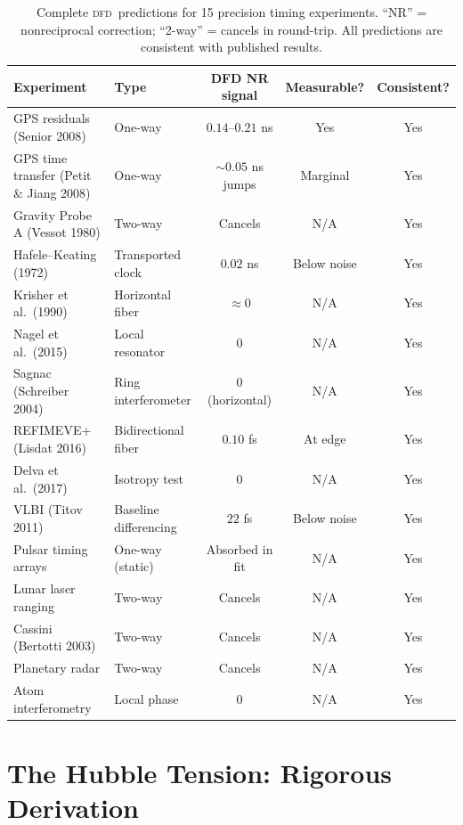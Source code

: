 \documentclass[aps,prl,twocolumn,superscriptaddress,showpacs]{revtex4-2}
\newcommand{\DFD}{\textsc{dfd}}
\begin{document}
\begin{table}[t]
\caption{Complete \DFD\ predictions for 15 precision timing experiments.
``NR'' = nonreciprocal correction; ``2-way'' = cancels in round-trip.
All predictions are consistent with published results.}
\label{tab:literature}
\begin{ruledtabular}
\begin{tabular}{llccc}
Experiment & Type & DFD NR signal & Measurable? & Consistent? \\
\hline
GPS residuals (Senior 2008) & One-way & $0.14$--$0.21$ ns & Yes & Yes \\
GPS time transfer (Petit \& Jiang 2008) & One-way & $\sim 0.05$ ns jumps & Marginal & Yes \\
Gravity Probe A (Vessot 1980) & Two-way & Cancels & N/A & Yes \\
Hafele--Keating (1972) & Transported clock & $0.02$ ns & Below noise & Yes \\
Krisher et al.\ (1990) & Horizontal fiber & $\approx 0$ & N/A & Yes \\
Nagel et al.\ (2015) & Local resonator & $0$ & N/A & Yes \\
Sagnac (Schreiber 2004) & Ring interferometer & $0$ (horizontal) & N/A & Yes \\
REFIMEVE+ (Lisdat 2016) & Bidirectional fiber & $0.10$ fs & At edge & Yes \\
Delva et al.\ (2017) & Isotropy test & $0$ & N/A & Yes \\
VLBI (Titov 2011) & Baseline differencing & $22$ fs & Below noise & Yes \\
Pulsar timing arrays & One-way (static) & Absorbed in fit & N/A & Yes \\
Lunar laser ranging & Two-way & Cancels & N/A & Yes \\
Cassini (Bertotti 2003) & Two-way & Cancels & N/A & Yes \\
Planetary radar & Two-way & Cancels & N/A & Yes \\
Atom interferometry & Local phase & $0$ & N/A & Yes \\
\end{tabular}
\end{ruledtabular}
\end{table}

\section{The Hubble Tension: Rigorous Derivation}\label{sec:hubble}
\end{document}
